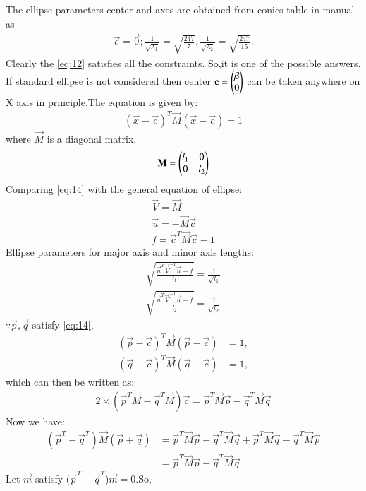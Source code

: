 \documentclass[journal,12pt,twocolumn]{IEEEtran}
\begin{document}
The ellipse parameters center and axes are obtained from conics table in manual as
\begin{align}
\vec{c} = \vec{0};
\frac{1}{\sqrt{\lambda_1}}  = \sqrt{\frac{247}{7}},
\frac{1}{\sqrt{\lambda_2}}  = \sqrt{\frac{247}{15}}.
\end{align}
Clearly the \eqref{eq:12} satisfies all the constraints. So,it is one of the possible answers.
If standard ellipse is not considered then center $\mathbf{c}=\begin{pmatrix}\beta\\0\end{pmatrix}$ can be taken anywhere on X axis in principle.The equation is given by:
\begin{align}
(\vec{x}-\vec{c})^T\vec{M}(\vec{x}-\vec{c})=1\label{eq:14}
\end{align}
where $\vec{M}$ is a diagonal matrix.
\begin{align}
    \mathbf{M}=\begin{pmatrix}l_1&0\\0&l_2\end{pmatrix}
\end{align}
Comparing \eqref{eq:14} with the general equation of ellipse:
\begin{align}
    \vec{V}=\vec{M}\\
    \vec{u}=-\vec{M}\vec{c}\\
    f=\vec{c}^T\vec{M}\vec{c}-1
\end{align}
Ellipse parameters for major axis and minor axis lengths:
\begin{align}
    \sqrt{\frac{\vec{u}^T\vec{V}^{-1}\vec{u}-f}{l_1}}=\frac{1}{\sqrt{l_1}}\\
    \sqrt{\frac{\vec{u}^T\vec{V}^{-1}\vec{u}-f}{l_2}}=\frac{1}{\sqrt{l_2}}
\end{align}
$\because \vec{p}, \vec{q}$ satisfy \eqref{eq:14},
\begin{align}
\label{eq:ellipse_std_ab}
(\vec{p}-\vec{c})^T\vec{M}(\vec{p}-\vec{c}) &= 1,
\\
(\vec{q}-\vec{c})^T\vec{M}(\vec{q}-\vec{c}) &= 1,
\end{align}
which can then be written as:
\begin{align}
    2\times(\vec{p}^T\vec{M}-\vec{q}^T\vec{M})\vec{c}=\vec{p}^T\vec{M}\vec{p}-\vec{q}^T\vec{M}\vec{q}
\end{align}
Now we have:
\begin{align}
   (\vec{p}^T-\vec{q}^T)\vec{M}(\vec{p}+\vec{q})&=\vec{p}^T\vec{M}\vec{p}-\vec{q}^T\vec{M}\vec{q}+\vec{p}^T\vec{M}\vec{q}-\vec{q}^T\vec{M}\vec{p}\\
   &=\vec{p}^T\vec{M}\vec{p}-\vec{q}^T\vec{M}\vec{q}
\end{align}
Let $\vec{m}$ satisfy ($\vec{p}^T-\vec{q}^T$)$\vec{m}=0$.So,
\end{document}
